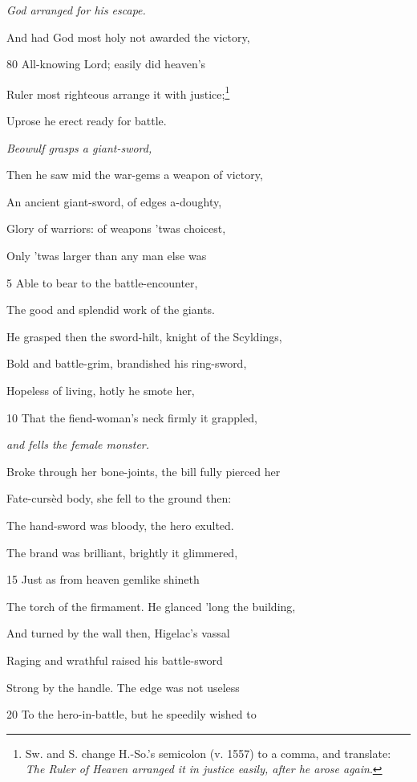 \emph{God arranged for
his escape.}

And had God most holy not awarded the victory,

80
All-knowing Lord; easily did heaven’s

Ruler most righteous arrange it with justice;\footnote{Sw. and S. change H.-So.’s semicolon (v. 1557) to a comma, and translate:
\emph{The Ruler of Heaven arranged it in justice easily, after he arose
again}.}

Uprose he erect ready for battle.



\emph{Beowulf grasps a
giant-sword,}

Then he saw mid the war-gems a weapon of victory,

An ancient giant-sword, of edges a-doughty,

Glory of warriors: of weapons ’twas choicest,

Only ’twas larger than any man else was

5
Able to bear to the battle-encounter,

The good and splendid work of the giants.

He grasped then the sword-hilt, knight of the Scyldings,

Bold and battle-grim, brandished his ring-sword,

Hopeless of living, hotly he smote her,

10
That the fiend-woman’s neck firmly it grappled,

\emph{and fells the female
monster.}

Broke through her bone-joints, the bill fully pierced her

Fate-cursèd body, she fell to the ground then:

The hand-sword was bloody, the hero exulted.

The brand was brilliant, brightly it glimmered,

15
Just as from heaven gemlike shineth

The torch of the firmament. He glanced ’long the building,

And turned by the wall then, Higelac’s vassal

Raging and wrathful raised his battle-sword

Strong by the handle. The edge was not useless

20
To the hero-in-battle, but he speedily wished to

